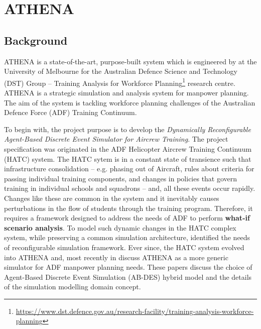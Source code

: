 \chapter{ATHENA} 

\label{Chapter2}

\section{Background}

ATHENA is a state-of-the-art, purpose-built system which is engineered by \textit{\groupname} at the University of Melbourne for the Australian Defence Science and Technology (DST) Group -- Training Analysis for Workforce Planning\footnote{\url{https://www.dst.defence.gov.au/research-facility/training-analysis-workforce-planning}} research centre. ATHENA is a strategic simulation and analysis system for manpower planning. The aim of the system is tackling workforce planning challenges of the Australian Defence Force (ADF) Training Continuum. 

To begin with, the project purpose is to develop the \textit{Dynamically Reconfigurable Agent-Based Discrete Event Simulator for Aircrew Training}. The project specification was originated in the ADF Helicopter Aircrew Training Continuum (HATC) system. The HATC\parencite{HATC} sytem is in a constant state of transience such that infrastructure consolidation -- e.g. phasing out of Aircraft, rules about criteria for passing individual training components, and changes in policies that govern training in individual schools and squadrons -- and, all these events occur rapidly. Changes like these are common in the system and it inevitably causes perturbations in the flow of students through the training program. Therefore, it requires a framework designed to address the needs of ADF to perform \textbf{what-if scenario analysis}. To model such dynamic changes in the HATC complex system, while preserving a common simulation architecture, \parencite{HATC} identified the needs of reconfigurable simulation framework. Ever since, the HATC system evolved into ATHENA and, most recently in \parencite{8248116} discuss ATHENA as a more generic simulator for ADF manpower planning needs. 
These papers discuss the choice of Agent-Based Discrete Event Simulation (AB-DES) hybrid model and the details of the simulation modelling domain concept.

